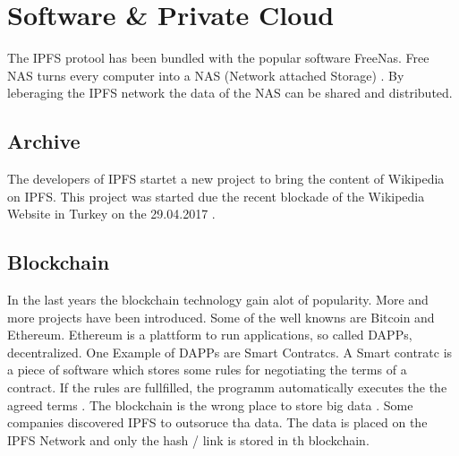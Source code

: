 \documentclass[a4paper,11pt, oneside]{report}
\theoremstyle{definition}
\begin{document}
\section{Software \& Private Cloud}
The IPFS protool has been bundled with the popular software FreeNas. Free NAS turns every computer into a NAS (Network attached Storage) \cite{freenas}. By leberaging the IPFS network the data of the NAS can be shared and distributed.

\subsection{Archive}
The developers of IPFS startet a new project to bring the content of Wikipedia on IPFS. This project was started due the recent blockade of the Wikipedia Website in Turkey on the 29.04.2017 \cite{turkeyblock}.

\subsection{Blockchain}
In the last years the blockchain technology gain alot of popularity. More and more projects have been introduced. Some of the well knowns are Bitcoin and Ethereum. Ethereum is a plattform to run applications, so called DAPPs, decentralized. One Example of DAPPs are Smart Contratcs. A Smart contratc is a piece of software which stores some rules for negotiating the terms of a contract. If the rules are fullfilled, the programm automatically executes the the agreed terms \cite{ether}. The blockchain is the wrong place to store big data \cite{blockchain-data}. Some companies discovered IPFS to outsoruce tha data. The data is placed on the IPFS Network and only the hash  / link is stored in th blockchain.
\end{document}
